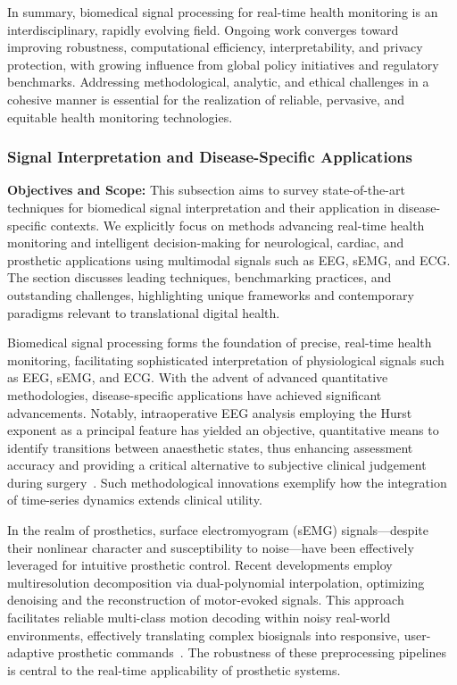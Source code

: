 \documentclass[sigconf]{acmart}
\begin{document}
In summary, biomedical signal processing for real-time health monitoring is an interdisciplinary, rapidly evolving field. Ongoing work converges toward improving robustness, computational efficiency, interpretability, and privacy protection, with growing influence from global policy initiatives and regulatory benchmarks. Addressing methodological, analytic, and ethical challenges in a cohesive manner is essential for the realization of reliable, pervasive, and equitable health monitoring technologies.

\subsubsection{Signal Interpretation and Disease-Specific Applications}

\textbf{Objectives and Scope:} This subsection aims to survey state-of-the-art techniques for biomedical signal interpretation and their application in disease-specific contexts. We explicitly focus on methods advancing real-time health monitoring and intelligent decision-making for neurological, cardiac, and prosthetic applications using multimodal signals such as EEG, sEMG, and ECG. The section discusses leading techniques, benchmarking practices, and outstanding challenges, highlighting unique frameworks and contemporary paradigms relevant to translational digital health.

Biomedical signal processing forms the foundation of precise, real-time health monitoring, facilitating sophisticated interpretation of physiological signals such as EEG, sEMG, and ECG. With the advent of advanced quantitative methodologies, disease-specific applications have achieved significant advancements. Notably, intraoperative EEG analysis employing the Hurst exponent as a principal feature has yielded an objective, quantitative means to identify transitions between anaesthetic states, thus enhancing assessment accuracy and providing a critical alternative to subjective clinical judgement during surgery~\cite{ref96}. Such methodological innovations exemplify how the integration of time-series dynamics extends clinical utility.

In the realm of prosthetics, surface electromyogram (sEMG) signals—despite their nonlinear character and susceptibility to noise—have been effectively leveraged for intuitive prosthetic control. Recent developments employ multiresolution decomposition via dual-polynomial interpolation, optimizing denoising and the reconstruction of motor-evoked signals. This approach facilitates reliable multi-class motion decoding within noisy real-world environments, effectively translating complex biosignals into responsive, user-adaptive prosthetic commands~\cite{ref97}. The robustness of these preprocessing pipelines is central to the real-time applicability of prosthetic systems.
\end{document}
